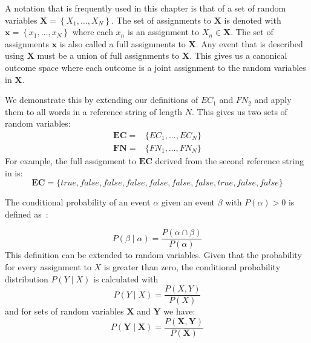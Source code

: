 \bigskip

A notation that is frequently used in this chapter is that of a set of \glspl{random variable} $\mathbf{X}=\left\{ X_1,\dots,X_N\right\}$.
The set of assignments to $\mathbf{X}$ is denoted with $\mathbf{x}=\left\{ x_1,\dots,x_N\right\}$ where each $x_n$ is an \gls{assignment} to $X_n\in\mathbf{X}$.
The set of assignments $\mathbf{x}$ is also called a \glspl{full assignment} to $\mathbf{X}$.
Any \gls{event} that is described using $\mathbf{X}$ must be a union of \glspl{full assignment} to $\mathbf{X}$.
This gives us a \gls{canonical outcome space} where each outcome is a joint assignment to the \glspl{random variable} in $\mathbf{X}$.

We demonstrate this by extending our definitions of $EC_1$ and $FN_2$ and apply them to all words in a reference string of length $N$.
This gives us two sets of \glspl{random variable}:
\begin{equation*}
  \begin{split}
    \mathbf{EC}=& \{EC_1, \dots, EC_N\}\\
    \mathbf{FN}=& \{FN_1, \dots, FN_N\}
  \end{split}
\end{equation*}
For example, the \gls{full assignment} to $\mathbf{EC}$ derived from the second reference string in  is:
\begin{equation*}
  \mathbf{EC}=\{true, false, false, false, false, false, false, true, false, false\}
\end{equation*}

\bigskip

The \gls{conditional probability} of an \gls{event} $\alpha$ given an \gls{event} $\beta$ with $P(\alpha)>0$ is defined as~\cite{koller2009probabilistic}:

\begin{equation}
\label{equ:conditional-probability-event}
P(\beta\mid\alpha) = \frac{P(\alpha\cap\beta)}{P(\alpha)}
\end{equation}
This definition can be extended to \glspl{random variable}.
Given that the probability for every assignment to $X$ is greater than zero, the \gls{conditional probability distribution} $P(Y\mid X)$ is calculated with
\begin{equation}
\label{equ:conditional-probability-random-variable}
P(Y\mid X) = \frac{P(X,Y)}{P(X)}
\end{equation}
and for sets of \glspl{random variable} $\mathbf{X}$ and $\mathbf{Y}$ we have:
\begin{equation}
\label{equ:conditional-probability-random-variable}
P(\mathbf{Y}\mid \mathbf{X}) = \frac{P(\mathbf{X},\mathbf{Y})}{P(\mathbf{X})}
\end{equation}

